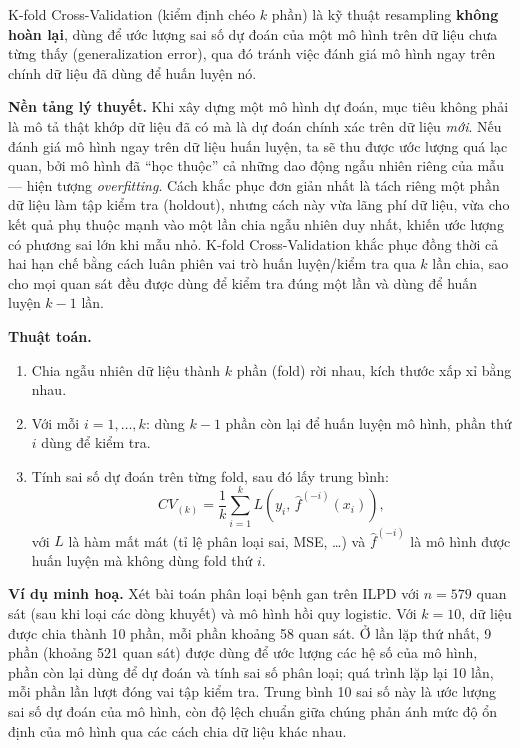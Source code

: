 \documentclass[14pt,a4paper]{extarticle}\usepackage[]{graphicx}\usepackage[]{xcolor}
\begin{document}
K-fold Cross-Validation (kiểm định chéo $k$ phần) là kỹ thuật resampling
\textbf{không hoàn lại}, dùng để ước lượng sai số dự đoán của một mô hình
trên dữ liệu chưa từng thấy (generalization error), qua đó tránh việc
đánh giá mô hình ngay trên chính dữ liệu đã dùng để huấn luyện nó.

\textbf{Nền tảng lý thuyết.} Khi xây dựng một mô hình dự đoán, mục tiêu
không phải là mô tả thật khớp dữ liệu đã có mà là dự đoán chính xác trên
dữ liệu \emph{mới}. Nếu đánh giá mô hình ngay trên dữ liệu huấn luyện, ta
sẽ thu được ước lượng quá lạc quan, bởi mô hình đã ``học thuộc'' cả những
dao động ngẫu nhiên riêng của mẫu --- hiện tượng \emph{overfitting}. Cách
khắc phục đơn giản nhất là tách riêng một phần dữ liệu làm tập kiểm tra
(holdout), nhưng cách này vừa lãng phí dữ liệu, vừa cho kết quả phụ thuộc
mạnh vào một lần chia ngẫu nhiên duy nhất, khiến ước lượng có phương sai
lớn khi mẫu nhỏ. K-fold Cross-Validation khắc phục đồng thời cả hai hạn
chế bằng cách luân phiên vai trò huấn luyện/kiểm tra qua $k$ lần chia, sao
cho mọi quan sát đều được dùng để kiểm tra đúng một lần và dùng để huấn
luyện $k-1$ lần.

\textbf{Thuật toán.}
\begin{enumerate}
  \item Chia ngẫu nhiên dữ liệu thành $k$ phần (fold) rời nhau, kích
        thước xấp xỉ bằng nhau.
  \item Với mỗi $i = 1, \ldots, k$: dùng $k-1$ phần còn lại để huấn luyện
        mô hình, phần thứ $i$ dùng để kiểm tra.
  \item Tính sai số dự đoán trên từng fold, sau đó lấy trung bình:
\[
  CV_{(k)} = \frac{1}{k}\sum_{i=1}^{k}
  L\!\left(y_i,\, \hat{f}^{(-i)}(x_i)\right),
\]
        với $L$ là hàm mất mát (tỉ lệ phân loại sai, MSE, \ldots) và
        $\hat{f}^{(-i)}$ là mô hình được huấn luyện mà không dùng fold thứ
        $i$.
\end{enumerate}

\textbf{Ví dụ minh hoạ.} Xét bài toán phân loại bệnh gan trên ILPD với
$n = 579$ quan sát (sau khi loại các dòng khuyết) và mô hình hồi quy
logistic. Với $k = 10$, dữ liệu được chia thành 10 phần, mỗi phần khoảng
58 quan sát. Ở lần lặp thứ nhất, 9 phần (khoảng 521 quan sát) được dùng để
ước lượng các hệ số của mô hình, phần còn lại dùng để dự đoán và tính sai
số phân loại; quá trình lặp lại 10 lần, mỗi phần lần lượt đóng vai tập
kiểm tra. Trung bình 10 sai số này là ước lượng sai số dự đoán của mô
hình, còn độ lệch chuẩn giữa chúng phản ánh mức độ ổn định của mô hình qua
các cách chia dữ liệu khác nhau.
\end{document}
